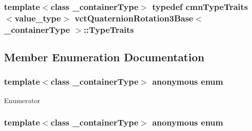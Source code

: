 \hypertarget{classvct_quaternion_rotation3_base_a78f36636344dd97b9837f9b15aedd1f7}{
\subsubsection[{Type\-Traits}]{\setlength{\rightskip}{0pt plus 5cm}template$<$class \-\_\-container\-Type$>$ typedef {\bf cmn\-Type\-Traits}$<$value\-\_\-type$>$ {\bf vct\-Quaternion\-Rotation3\-Base}$<$ \-\_\-container\-Type $>$\-::{\bf Type\-Traits}}}\label{classvct_quaternion_rotation3_base_a78f36636344dd97b9837f9b15aedd1f7}


\subsection{Member Enumeration Documentation}
\hypertarget{classvct_quaternion_rotation3_base_a6baf2fda4760908cbc94c53f79838804}{\subsubsection[{anonymous enum}]{\setlength{\rightskip}{0pt plus 5cm}template$<$class \-\_\-container\-Type$>$ anonymous enum}}\label{classvct_quaternion_rotation3_base_a6baf2fda4760908cbc94c53f79838804}
\begin{Desc}
\item[Enumerator]\par
\begin{description}
\item[{\em 
\hypertarget{classvct_quaternion_rotation3_base_a6baf2fda4760908cbc94c53f79838804a42527344f7f8ba3f199c418756497bc1}{S\-I\-Z\-E}\label{classvct_quaternion_rotation3_base_a6baf2fda4760908cbc94c53f79838804a42527344f7f8ba3f199c418756497bc1}
}]\end{description}
\end{Desc}
\hypertarget{classvct_quaternion_rotation3_base_a729ac03acdd5949ecf382629e563d2a0}{\subsubsection[{anonymous enum}]{\setlength{\rightskip}{0pt plus 5cm}template$<$class \-\_\-container\-Type$>$ anonymous enum}}\label{classvct_quaternion_rotation3_base_a729ac03acdd5949ecf382629e563d2a0}
